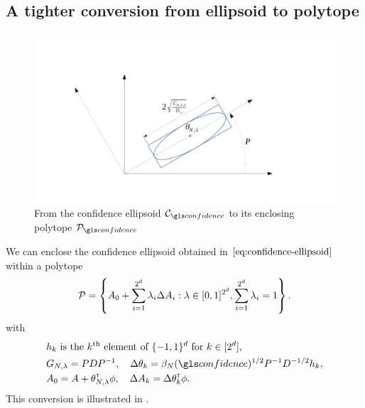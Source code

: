 \begin{subappendices}
	\subsection{A tighter conversion from ellipsoid to polytope}
	\label{sec:tight-polytope}
	
	\begin{figure}[ht]
		\centering
		\includegraphics[trim={3.8cm, 2cm, 5cm, 3.8cm}, clip, width=0.7\linewidth]{img/ellipsoid_to_polytope}
		\caption{From the confidence ellipsoid $\cC_\confidence$ to its enclosing polytope $\cP_\confidence$}
		\label{fig:ellipsoid_to_polytope}
	\end{figure}
	
	\begin{lemma}
		\label{lem:tight_polytope}
		\begin{leftbar}[lemmabar]
		We can enclose the confidence ellipsoid obtained in $\eqref{eq:confidence-ellipsoid}$ within a polytope
		\begin{equation}
		\mathcal{P} = \left\{ A_{0}+\sum_{i=1}^{2^d}\lambda_{i}\Delta A_{i}: \lambda\in[0, 1]^{2^d},  \sum_{i=1}^{2^d}\lambda_{i}=1\right\}.
		\end{equation}
		with 
		\begin{align*}
		&h_k \text{ is the }k^\text{th}\text{ element of }\{-1,1\}^d\text{ for } k\in[2^d],\\
		&G_{N,\lambda} = PDP^{-1}, \quad \Delta\theta_k = \beta_{N}(\confidence)^{1/2} P^{-1}D^{-1/2} h_k, \\
		&A_0 = A + \theta_{N,\lambda}^\transp\phi, \quad \Delta A_k = \Delta\theta_k^\transp\phi.
		\end{align*}
		This conversion is illustrated in .
		\end{leftbar}
	\end{lemma}


\end{subappendices}
